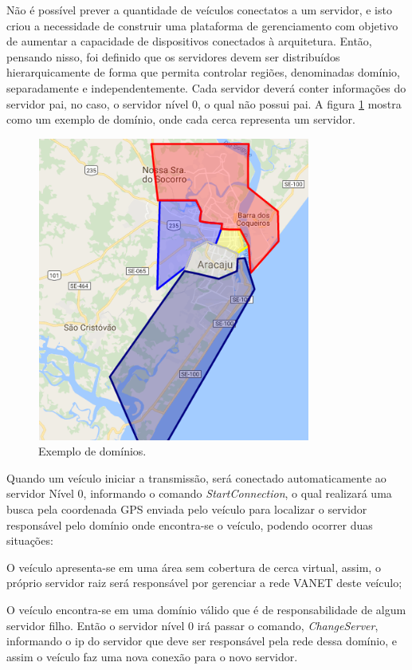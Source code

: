 \documentclass[
	12pt,				%
	oneside,			%
	a4paper,			%
	english,			%
	brazil				%
	]{abntex2ppgsi}
\begin{document}

Não é possível prever a quantidade de veículos conectatos a um servidor, e isto criou a necessidade de construir uma plataforma de gerenciamento com objetivo de aumentar a capacidade de dispositivos conectados à arquitetura. Então, pensando nisso, foi definido que os servidores devem ser distribuídos hierarquicamente de forma que permita controlar regiões, denominadas domínio, separadamente e independentemente. Cada servidor deverá conter informações do servidor pai, no caso, o servidor nível 0, o qual  não possui pai. A figura \ref{fig:dDominios} mostra como um exemplo de domínio, onde cada cerca representa um servidor.

\begin{figure}[!h]
	\centering
	\includegraphics [width=9cm,height=10cm] {images/dominios.png}
	\caption{Exemplo de domínios.}
	\label{fig:dDominios}
\end{figure}


Quando um veículo iniciar a transmissão, será conectado automaticamente ao servidor Nível 0, informando o comando \textit{StartConnection}, o qual realizará uma busca pela coordenada GPS enviada pelo veículo para localizar o servidor responsável pelo domínio onde encontra-se o veículo, podendo ocorrer duas situações:
\begin{enumerate*}
	\item{O veículo apresenta-se em uma área sem cobertura de cerca virtual, assim,  o próprio servidor raiz será responsável por gerenciar a rede VANET deste veículo;}
	\item{O veículo encontra-se em uma domínio válido que é de responsabilidade de algum servidor filho. Então o servidor nível 0 irá passar o comando,  \textit{ChangeServer},  informando o ip do servidor que deve ser responsável pela rede dessa domínio,  e assim o veículo faz uma nova conexão para o novo servidor.}
\end{enumerate*}
 
\end{document}

